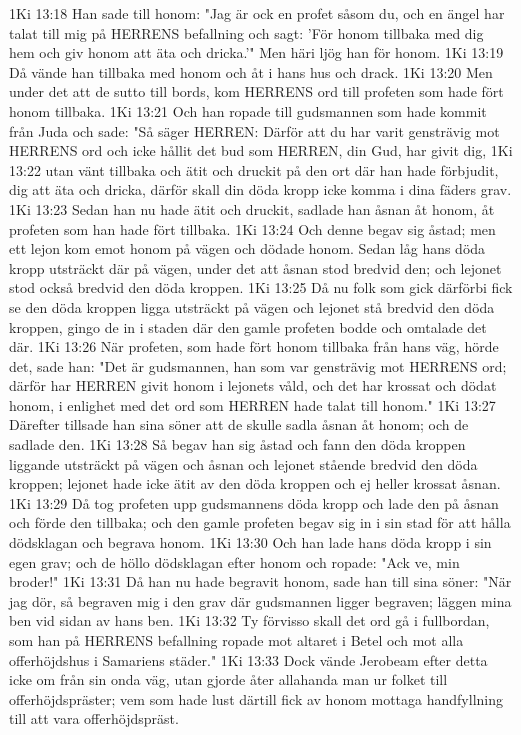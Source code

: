 1Ki 13:18  Han sade till honom: "Jag är ock en profet såsom du, och en ängel har talat till mig på HERRENS befallning och sagt: 'För honom tillbaka med dig hem och giv honom att äta och dricka.'" Men häri ljög han för honom.
1Ki 13:19  Då vände han tillbaka med honom och åt i hans hus och drack.
1Ki 13:20  Men under det att de sutto till bords, kom HERRENS ord till profeten som hade fört honom tillbaka.
1Ki 13:21  Och han ropade till gudsmannen som hade kommit från Juda och sade: "Så säger HERREN: Därför att du har varit gensträvig mot HERRENS ord och icke hållit det bud som HERREN, din Gud, har givit dig,
1Ki 13:22  utan vänt tillbaka och ätit och druckit på den ort där han hade förbjudit, dig att äta och dricka, därför skall din döda kropp icke komma i dina fäders grav.
1Ki 13:23  Sedan han nu hade ätit och druckit, sadlade han åsnan åt honom, åt profeten som han hade fört tillbaka.
1Ki 13:24  Och denne begav sig åstad; men ett lejon kom emot honom på vägen och dödade honom. Sedan låg hans döda kropp utsträckt där på vägen, under det att åsnan stod bredvid den; och lejonet stod också bredvid den döda kroppen.
1Ki 13:25  Då nu folk som gick därförbi fick se den döda kroppen ligga utsträckt på vägen och lejonet stå bredvid den döda kroppen, gingo de in i staden där den gamle profeten bodde och omtalade det där.
1Ki 13:26  När profeten, som hade fört honom tillbaka från hans väg, hörde det, sade han: "Det är gudsmannen, han som var gensträvig mot HERRENS ord; därför har HERREN givit honom i lejonets våld, och det har krossat och dödat honom, i enlighet med det ord som HERREN hade talat till honom."
1Ki 13:27  Därefter tillsade han sina söner att de skulle sadla åsnan åt honom; och de sadlade den.
1Ki 13:28  Så begav han sig åstad och fann den döda kroppen liggande utsträckt på vägen och åsnan och lejonet stående bredvid den döda kroppen; lejonet hade icke ätit av den döda kroppen och ej heller krossat åsnan.
1Ki 13:29  Då tog profeten upp gudsmannens döda kropp och lade den på åsnan och förde den tillbaka; och den gamle profeten begav sig in i sin stad för att hålla dödsklagan och begrava honom.
1Ki 13:30  Och han lade hans döda kropp i sin egen grav; och de höllo dödsklagan efter honom och ropade: "Ack ve, min broder!"
1Ki 13:31  Då han nu hade begravit honom, sade han till sina söner: "När jag dör, så begraven mig i den grav där gudsmannen ligger begraven; läggen mina ben vid sidan av hans ben.
1Ki 13:32  Ty förvisso skall det ord gå i fullbordan, som han på HERRENS befallning ropade mot altaret i Betel och mot alla offerhöjdshus i Samariens städer."
1Ki 13:33  Dock vände Jerobeam efter detta icke om från sin onda väg, utan gjorde åter allahanda man ur folket till offerhöjdspräster; vem som hade lust därtill fick av honom mottaga handfyllning till att vara offerhöjdspräst.
